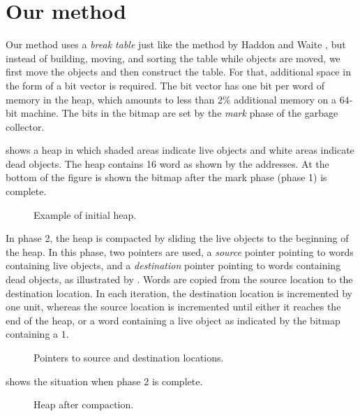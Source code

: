 \section{Our method}

Our method uses a \emph{break table} just like the method by Haddon
and Waite \cite{Haddon:1967}, but instead of building, moving, and
sorting the table while objects are moved, we first move the objects
and then construct the table.  For that, additional space in the form
of a bit vector is required.  The bit vector has one bit per word of
memory in the heap, which amounts to less than $2$\% additional memory
on a $64$-bit machine.  The bits in the bitmap are set by the
\emph{mark} phase of the garbage collector.

 shows a heap in which shaded areas indicate
live objects and white areas indicate dead objects.  The heap contains
16 word as shown by the addresses.  At the bottom of the figure is
shown the bitmap after the mark phase (phase 1) is complete.

\begin{figure}
\begin{center}
\end{center}
\caption{\label{fig-example-a}
Example of initial heap.}
\end{figure}

In phase 2, the heap is compacted by sliding the live objects to the
beginning of the heap.  In this phase, two pointers are used, a
\emph{source} pointer pointing to words containing live objects, and a
\emph{destination} pointer pointing to words containing dead objects,
as illustrated by .  Words are copied from the
source location to the destination location.  In each iteration, the
destination location is incremented by one unit, whereas the source
location is incremented until either it reaches the end of the heap,
or a word containing a live object as indicated by the bitmap
containing a $1$.

\begin{figure}
\begin{center}
\end{center}
\caption{\label{fig-example-b}
Pointers to source and destination locations.}
\end{figure}

 shows the situation when phase 2 is complete. 

\begin{figure}
\begin{center}
\end{center}
\caption{\label{fig-example-c}
Heap after compaction.}
\end{figure}

